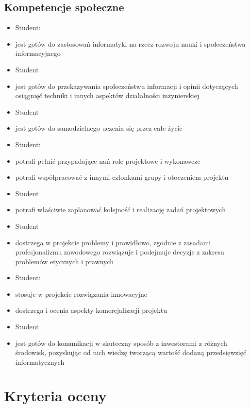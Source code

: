 \documentclass[12pt, a4paper]{article}
\begin{document}
\subsection*{Kompetencje społeczne}
\begin{itemize}
  \item Student:
  \item jest gotów do zastosowań informatyki na rzecz rozwoju nauki i społeczeństwa informacyjnego
  \item Student
  \item jest gotów do przekazywania społeczeństwu informacji i opinii dotyczących osiągnięć techniki i innych aspektów działalności inżynierskiej
  \item Student
  \item jest gotów do samodzielnego uczenia się przez całe życie
  \item Student:
  \item potrafi pełnić przypadające nań role projektowe i wykonawcze
  \item potrafi współpracować z innymi członkami grupy i otoczeniem projektu
  \item Student
  \item potrafi właściwie zaplanować kolejność i realizację zadań projektowych
  \item Student
  \item dostrzega w projekcie problemy i prawidłowo, zgodnie z zasadami profesjonalizmu zawodowego rozwiązuje i podejmuje decyzje z zakresu problemów etycznych i prawnych
  \item Student:
  \item stosuje w projekcie rozwiązania innowacyjne
  \item dostrzega i ocenia aspekty komercjalizacji projektu
  \item Student
  \item jest gotów do komunikacji w skuteczny sposób z inwestorami z różnych środowisk, pozyskując od nich wiedzę tworzącą wartość dodaną przedsięwzięć informatycznych
\end{itemize}

\section{Kryteria oceny}
\end{document}
